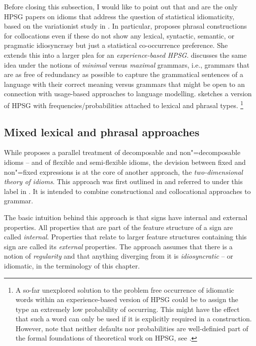 \documentclass[output=paper]{langsci/langscibook}
\begin{document}
Before closing this subsection, I would like to point out that 
\cite{Riehemann2001a} and \cite{RB99a} are the only HPSG papers on idioms that address the question of statistical idiomaticity, based on the variationist study in \cite{Bender2000a}. 
In particular, \citet[--301]{Riehemann2001a} proposes phrasal constructions for collocations even if these do not show any lexical, syntactic, semantic, or pragmatic idiosyncrasy but just a statistical co-occurrence preference. 
She extends this into a larger plea for an \emph{experience-based HPSG}. 
%
\cite{Bender2000a} discusses the same idea under the notions of \emph{minimal} versus \emph{maximal} grammars, i.e., grammars that are as free of redundancy as possible to capture the grammatical sentences of a language with their correct meaning versus grammars that might be open to an connection with usage-based approaches to language modelling.
\citet[]{Bender2000a} sketches a version of HPSG with frequencies/probabilities attached to lexical and phrasal types.%
\footnote{A so-far unexplored solution to the problem free occurrence of idiomatic words within an experience-based version of HPSG could be to assign the type  an extremely low probability of occurring. This might have the effect that such a word can only be used if it is explicitly required in a construction. However, note that neither defaults nor probabilities are well-definied part of the formal foundations of theoretical work on HPSG, see .}

\subsection{Mixed lexical and phrasal approaches}
\label{Sec-Mixed}

While \cite{Riehemann2001a} proposes a parallel treatment of decomposable and non"=decomposable idioms -- and of flexible and semi-flexible idioms, the devision between fixed and non"=fixed expressions is at the core of another approach, the \emph{two-dimensional theory of idioms}. This approach was first outlined in \cite{Sailer2000a} and referred to under this label in \cite{Richter:Sailer:09,Richter:Sailer:14}. It is intended to combine constructional and collocational approaches to grammar.

The basic intuition behind this approach is that signs have internal and external properties. 
All properties that are part of the feature structure of a sign are called \emph{internal}. 
Properties that relate to larger feature structures containing this sign are called its \emph{external} properties. 
The approach assumes that there is a notion of \emph{regularity} and that anything diverging from it is \emph{idiosyncratic} -- or idiomatic, in the terminology of this chapter. 
\end{document}
